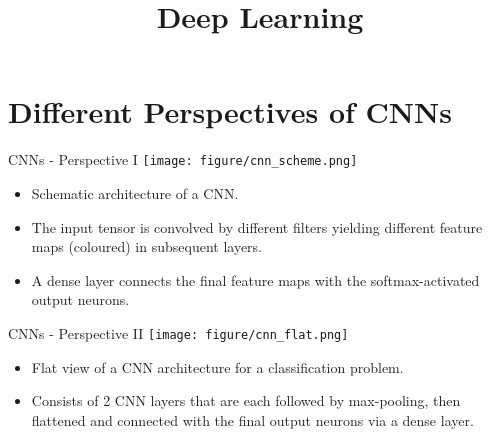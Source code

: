 




\newcommand{\titlefigure}{figure/alexnet.png}
\newcommand{\learninggoals}{
  \item Architecture
}

\title{Deep Learning}
\date{}




\section{Different Perspectives of CNNs}
\begin{vbframe}{CNNs - Perspective I}
\center
\texttt{[image: figure/cnn\_scheme.png]}
\begin{itemize}
\item Schematic architecture of a CNN.
\item The input tensor is convolved by different filters yielding different feature maps (coloured) in subsequent layers.
\item A dense layer connects the final feature maps with the softmax-activated output neurons.
\end{itemize}
\end{vbframe}

\begin{vbframe}{CNNs - Perspective II}
\center
\texttt{[image: figure/cnn\_flat.png]}
\begin{itemize}
\item Flat view of a CNN architecture for a classification problem.
\item Consists of 2 CNN layers that are each followed by max-pooling, then flattened and connected with the final output neurons via a dense layer.
\end{itemize}
\end{vbframe}


